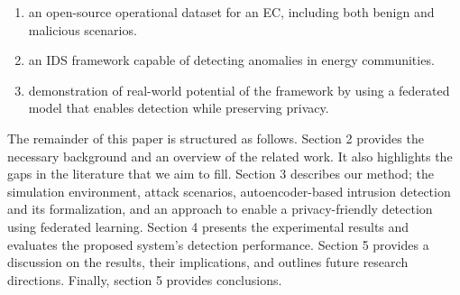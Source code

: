 \begin{enumerate}

     \item an open-source operational dataset for an EC, including both benign and malicious scenarios. %
    \item an IDS framework capable of detecting anomalies in energy communities.
    \item demonstration of real-world potential of the framework by using a federated model that enables detection while preserving privacy.

    \end{enumerate}

The remainder of this paper is structured as follows. Section 2 provides the necessary background and an overview of the related work. It also highlights the gaps in the literature that we aim to fill. Section 3 describes our method; the simulation environment, attack scenarios, autoencoder-based intrusion detection and its formalization, and an approach to enable a privacy-friendly detection using federated learning. Section 4 presents the experimental results and evaluates the proposed system's detection performance. Section 5 provides a discussion on the results, their implications, and outlines future research directions. Finally, section 5 provides conclusions.



